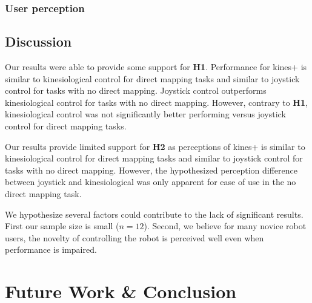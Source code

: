 \documentclass{sigchi}
\newcommand\tabhead[1]{\small\textbf{#1}}
\begin{document}
\subsubsection{User perception}

\subsection{Discussion}

Our results were able to provide some support for \textbf{H1}. Performance for kines+ is similar to kinesiological control for direct mapping tasks and similar to joystick control for tasks with no direct mapping. Joystick control outperforms kinesiological control for tasks with no direct mapping. However, contrary to \textbf{H1}, kinesiological control was not significantly better performing versus joystick control for direct mapping tasks.

Our results provide limited support for \textbf{H2} as perceptions of kines+ is similar to kinesiological control for direct mapping tasks and similar to joystick control for tasks with no direct mapping. However, the hypothesized perception difference between joystick and kinesiological was only apparent for ease of use in the no direct mapping task.

We hypothesize several factors could contribute to the lack of significant results. First our sample size is small ($n=12$). Second, we believe for many novice robot users, the novelty of controlling the robot is perceived well even when performance is impaired.

\section{Future Work \& Conclusion}



\end{document}
